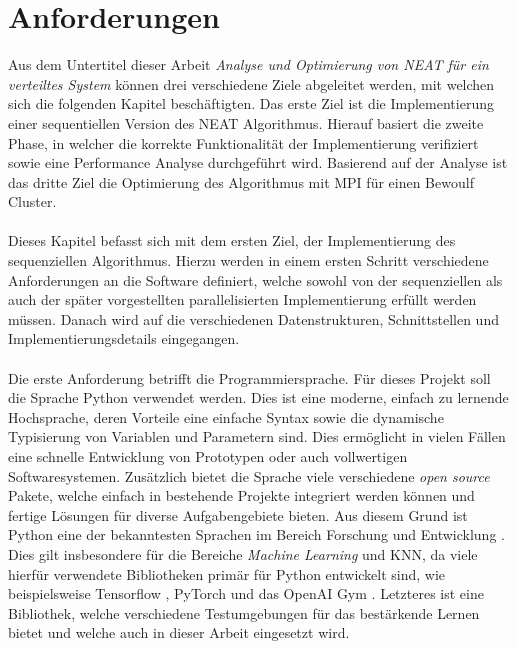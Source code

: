 \section{Anforderungen}
\label{sec:requirements}
Aus dem Untertitel dieser Arbeit \emph{Analyse und Optimierung von \ac{NEAT} für ein verteiltes System} können drei verschiedene Ziele abgeleitet werden, mit welchen sich die folgenden Kapitel beschäftigten. Das erste Ziel ist die Implementierung einer sequentiellen Version des \ac{NEAT} Algorithmus. Hierauf basiert die zweite Phase, in welcher die korrekte Funktionalität der Implementierung verifiziert sowie eine Performance Analyse durchgeführt wird. 
Basierend auf der Analyse ist das dritte Ziel die Optimierung des Algorithmus mit \ac{MPI} für einen Bewoulf Cluster.
\\\\
Dieses Kapitel befasst sich mit dem ersten Ziel, der Implementierung des sequenziellen Algorithmus. Hierzu werden in einem ersten Schritt verschiedene Anforderungen an die Software definiert, welche sowohl von der sequenziellen als auch der später vorgestellten parallelisierten Implementierung erfüllt werden müssen. Danach wird auf die verschiedenen Datenstrukturen, Schnittstellen und Implementierungsdetails eingegangen.
\\\\
Die erste Anforderung betrifft die Programmiersprache. Für dieses Projekt soll die Sprache Python verwendet werden. Dies ist eine moderne, einfach zu lernende Hochsprache, deren Vorteile eine einfache Syntax sowie die dynamische Typisierung von Variablen und Parametern sind. Dies ermöglicht in vielen Fällen eine schnelle Entwicklung von Prototypen oder auch vollwertigen Softwaresystemen. Zusätzlich bietet die Sprache viele verschiedene \emph{open source} Pakete, welche einfach in bestehende Projekte integriert werden können und fertige Lösungen für diverse Aufgabengebiete bieten. Aus diesem Grund ist Python eine der bekanntesten Sprachen im Bereich Forschung und Entwicklung \cite{dalcin2011parallel}. Dies gilt insbesondere für die Bereiche \emph{Machine Learning} und \ac{KNN}, da viele hierfür verwendete Bibliotheken primär für Python entwickelt sind, wie beispielsweise Tensorflow \cite{tensorflow2015}, PyTorch \cite{pytorch2019} und das OpenAI Gym \cite{OpenAiGym2016}. Letzteres ist eine Bibliothek, welche verschiedene Testumgebungen für das bestärkende Lernen bietet und welche auch in dieser Arbeit eingesetzt wird.  
\\\\
